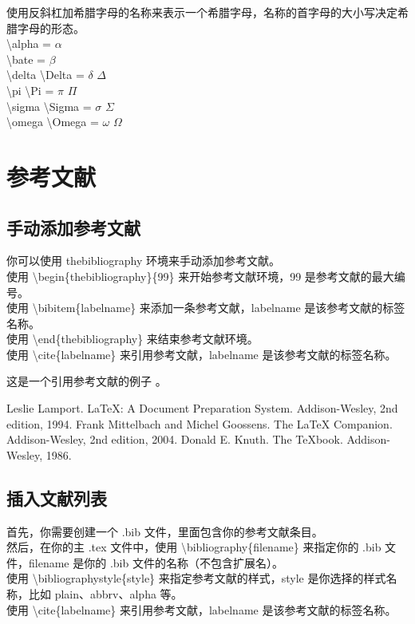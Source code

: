 \documentclass[a4paper,12pt]{article}
\begin{document}
            使用反斜杠加希腊字母的名称来表示一个希腊字母，名称的首字母的大小写决定希腊字母的形态。
            \\ \indent \textbackslash alpha = $\alpha$
            \\ \indent \textbackslash bate = $\beta$
            \\ \indent \textbackslash delta \textbackslash Delta = $\delta$ $\Delta$
            \\ \indent \textbackslash pi \textbackslash Pi = $\pi$ $\Pi$
            \\ \indent \textbackslash sigma \textbackslash Sigma = $\sigma$ $\Sigma$
            \\ \indent \textbackslash omega \textbackslash Omega = $\omega$ $\Omega$
      
            
    \section{参考文献} 
        \subsection{手动添加参考文献}
        你可以使用 thebibliography 环境来手动添加参考文献。
        \\ \indent 使用 \textbackslash begin\{thebibliography\}\{99\} 来开始参考文献环境，99 是参考文献的最大编号。
        \\ \indent 使用 \textbackslash bibitem\{labelname\} 来添加一条参考文献，labelname 是该参考文献的标签名称。
        \\ \indent 使用 \textbackslash end\{thebibliography\} 来结束参考文献环境。
        \\ \indent 使用 \textbackslash cite\{labelname\} 来引用参考文献，labelname 是该参考文献的标签名称。
        
        这是一个引用参考文献的例子 \cite{leslie}。

        \begin{thebibliography}{99}
             Leslie Lamport. LaTeX: A Document Preparation System. Addison-Wesley, 2nd edition, 1994.
             Frank Mittelbach and Michel Goossens. The LaTeX Companion. Addison-Wesley, 2nd edition, 2004.
             Donald E. Knuth. The TeXbook. Addison-Wesley, 1986.
        \end{thebibliography}  

        \subsection{插入文献列表}
        \indent 首先，你需要创建一个 .bib 文件，里面包含你的参考文献条目。
        \\ \indent 然后，在你的主 .tex 文件中，使用 \textbackslash bibliography\{filename\} 来指定你的 .bib 文件，filename 是你的 .bib 文件的名称（不包含扩展名）。
        \\ \indent 使用 \textbackslash bibliographystyle\{style\} 来指定参考文献的样式，style 是你选择的样式名称，比如 plain、abbrv、alpha 等。
        \\ \indent 使用 \textbackslash cite\{labelname\} 来引用参考文献，labelname 是该参考文献的标签名称。 
        
\end{document}
